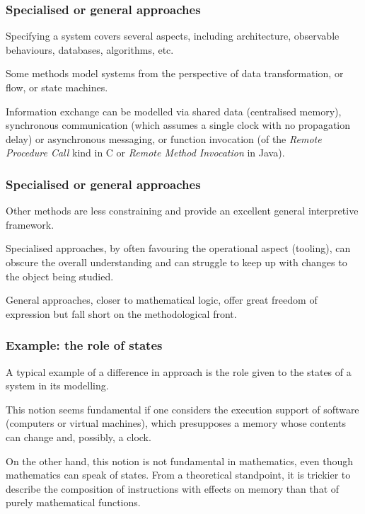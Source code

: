 \documentclass[compress,dvipdfmx]{beamer}
\begin{document}
%
\begin{frame}
  \frametitle{Specialised or general approaches}

  Specifying a system covers several aspects, including architecture,
  observable behaviours, databases, algorithms, etc.

  \bigskip

  Some methods model systems from the perspective of data
  transformation, or flow, or state machines.

  \bigskip

  Information exchange can be modelled via shared data (centralised
  memory), synchronous communication (which assumes a single clock
  with no propagation delay) or asynchronous messaging, or function
  invocation (of the \emph{Remote Procedure Call} kind in \textsf{C}
  or \emph{Remote Method Invocation} in \textsf{Java}).

\end{frame}

%
\begin{frame}
  \frametitle{Specialised or general approaches}

  Other methods are less constraining and provide an excellent general
  interpretive framework.

  \bigskip

  Specialised approaches, by often favouring the operational aspect
  (tooling), can obscure the overall understanding and can struggle to
  keep up with changes to the object being studied.

  \bigskip

  General approaches, closer to mathematical logic, offer great
  freedom of expression but fall short on the methodological front.

\end{frame}

%
\begin{frame}
  \frametitle{Example: the role of states}

  A typical example of a difference in approach is the role given to
  the states of a system in its modelling.

  \bigskip

  This notion seems fundamental if one considers the execution support
  of software (computers or virtual machines), which presupposes a
  memory whose contents can change and, possibly, a clock.

  \bigskip

  On the other hand, this notion is not fundamental in mathematics,
  even though mathematics can speak of states. From a theoretical
  standpoint, it is trickier to describe the composition of
  instructions with effects on memory than that of purely mathematical
  functions.

\end{frame}
\end{document}
